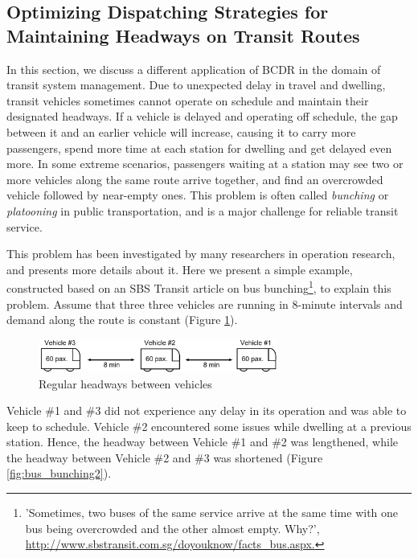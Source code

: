 \documentclass[jair,twoside,11pt,theapa]{article}
\begin{document}
\subsection{Optimizing Dispatching Strategies for Maintaining Headways on Transit Routes}


In this section, we discuss a different application of BCDR in the domain of
transit system management. Due to unexpected delay in travel and dwelling,
transit vehicles sometimes cannot operate on schedule and maintain their
designated headways. If a vehicle is delayed and operating off schedule, the gap
between it and an earlier vehicle will increase, causing it to carry more
passengers, spend more time at each station for dwelling and get delayed even
more. In some extreme scenarios, passengers waiting at a station may see two or
more vehicles along the same route arrive together, and find an overcrowded
vehicle followed by near-empty ones. This problem is often called
\textit{bunching} or \textit{platooning} in public transportation, and is a
major challenge for reliable transit service.


This problem has been investigated by many researchers in operation research,
and  presents more details about it. Here we present a
simple example, constructed based on an SBS Transit article on bus
bunching\footnote{'Sometimes, two buses of the same service arrive at the same
time with one bus being overcrowded and the other almost empty. Why?',
\url{http://www.sbstransit.com.sg/doyouknow/facts_bus.aspx.}}, to explain this
problem. Assume that three three vehicles are running in 8-minute intervals and
demand along the route is constant (Figure \ref{fig:bus_bunching1}).


\begin{figure}[htb]
	\centering
	\includegraphics[width=0.7\textwidth]{figures/MBTA/bunching1.pdf}
	\caption{Regular headways between vehicles}
	\label{fig:bus_bunching1}
\end{figure}

Vehicle \#1 and \#3 did not experience any delay in its operation and was able
to keep to schedule. Vehicle \#2 encountered some issues while dwelling at a
previous station. Hence, the headway between Vehicle \#1 and \#2 was lengthened,
while the headway between Vehicle \#2 and \#3 was shortened (Figure \ref{fig:bus_bunching2}).
\end{document}
